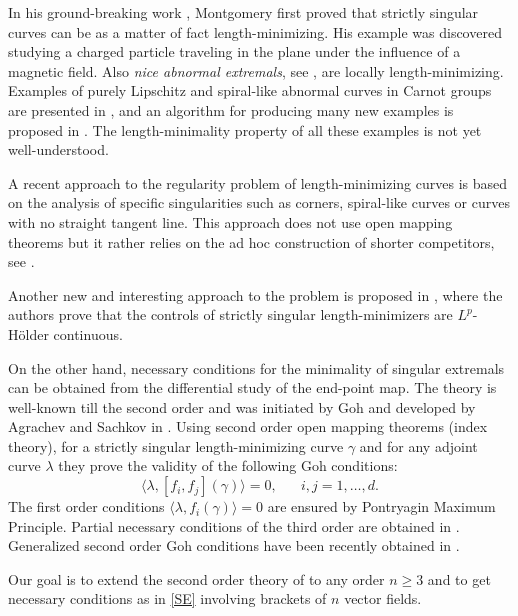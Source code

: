 \documentclass[12pt, reqno]{amsart}
\theoremstyle{plain}
\theoremstyle{definition}
\theoremstyle{remark}
\numberwithin{equation}{section}
\newcommand{\0}{\theta}
\newcommand{\1}{{-1}}
\renewcommand{\=}{\coloneqq}
\renewcommand{\.}{\dots}
\newcommand{\be}{\begin{equation}}
\newcommand{\ee}{\end{equation}}
\begin{document}
In his ground-breaking work \cite{Mon94}, 
 Montgomery  first proved that {\color{black} strictly singular} curves can be as a matter of fact  length-minimizing.
 His example was discovered studying a
 charged particle traveling in the plane under
the influence of a magnetic field.
 Also   \emph{nice abnormal extremals}, see  \cite{LS95}, are locally length-minimizing.
 Examples of purely Lipschitz and spiral-like abnormal curves in Carnot groups are presented in \cite{LDLMV13,LDLMV18}, and an algorithm for producing many new examples is proposed in \cite{H20}.  The length-minimality property of all these examples is not  yet well-understood. 
 
 
 
 
 A   recent approach  to the regularity problem of length-minimizing curves is based on the analysis of specific singularities such as corners, spiral-like curves or
 curves with no  straight tangent line. This approach  does not use   open mapping theorems but it rather relies on the ad hoc construction of shorter competitors, see 
  \cite{BCJPS20, HL16, HLprep, LM08, Monti14, MPV18, MS21}.
  
  {\color{black} Another new and interesting approach to the problem is proposed in \cite{Lev22}, where the authors prove that the controls of strictly singular length-minimizers are $L^p$-H\"{o}lder continuous.} 
 

On the other hand, necessary conditions for the minimality of singular extremals can be obtained from the differential study of the end-point map. The   theory  is well-known till the second order and was initiated by Goh \cite{Goh66} and developed by Agrachev and Sachkov in \cite{AgrSac}. Using second order open mapping theorems (index theory), 
for a strictly singular length-minimizing curve $\gamma$ and for any adjoint curve $\lambda$ they  prove the validity of the following Goh conditions:
\be\label{SE}
\langle\lambda, [f_i,f_j](\gamma)\rangle =0,  \quad \textrm{ $i,j=1,\ldots,d$.}
\ee
 The first order conditions $\langle\lambda, f_i (\gamma)\rangle =0$ are ensured by 
 Pontryagin Maximum Principle. Partial necessary conditions  of the third order  are obtained  in \cite{BMP20}. {\color{black} 
 Generalized second order Goh conditions have been recently obtained in \cite{Joz21}.}


 
Our goal is to extend the second order theory of \cite{AS96} to any order $n\geq 3$ and to get necessary conditions as in \eqref{SE} involving brackets of $n$ vector fields.
\end{document}
